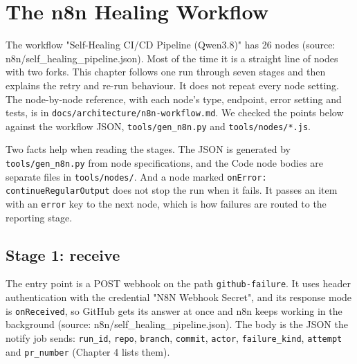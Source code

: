 
\chapter{The n8n Healing Workflow}

The workflow "Self-Healing CI/\allowbreak{}CD Pipeline (Qwen3.8)" has 26 nodes (source: n8n/\allowbreak{}self\_\allowbreak{}healing\_\allowbreak{}pipeline.json). Most of the time it is a straight line of nodes with two forks. This chapter follows one run through seven stages and then explains the retry and re-run behaviour. It does not repeat every node setting. The node-by-node reference, with each node's type, endpoint, error setting and tests, is in \texttt{docs/\allowbreak{}architecture/\allowbreak{}n8n-\allowbreak{}workflow.\allowbreak{}md}. We checked the points below against the workflow JSON, \texttt{tools/\allowbreak{}gen\_\allowbreak{}n8n.\allowbreak{}py} and \texttt{tools/\allowbreak{}nodes/\allowbreak{}*.\allowbreak{}js}.

Two facts help when reading the stages. The JSON is generated by \texttt{tools/\allowbreak{}gen\_\allowbreak{}n8n.\allowbreak{}py} from node specifications, and the Code node bodies are separate files in \texttt{tools/\allowbreak{}nodes/\allowbreak{}}. And a node marked \texttt{onError:\allowbreak{} continueRegularOutput} does not stop the run when it fails. It passes an item with an \texttt{error} key to the next node, which is how failures are routed to the reporting stage.

\section{Stage 1: receive}



The entry point is a POST webhook on the path \texttt{github-\allowbreak{}failure}. It uses header authentication with the credential "N8N Webhook Secret", and its response mode is \texttt{onReceived}, so GitHub gets its answer at once and n8n keeps working in the background (source: n8n/\allowbreak{}self\_\allowbreak{}healing\_\allowbreak{}pipeline.json). The body is the JSON the notify job sends: \texttt{run\_\allowbreak{}id}, \texttt{repo}, \texttt{branch}, \texttt{commit}, \texttt{actor}, \texttt{failure\_\allowbreak{}kind}, \texttt{attempt} and \texttt{pr\_\allowbreak{}number} (Chapter 4 lists them).

